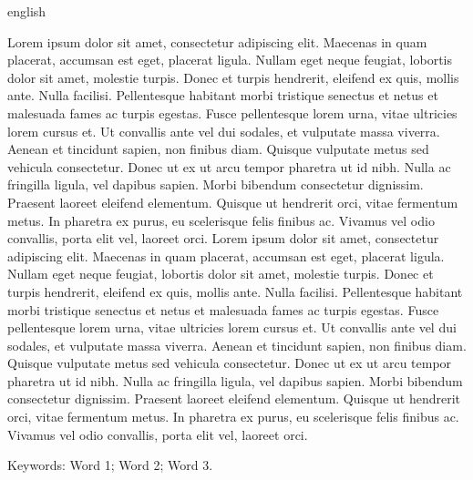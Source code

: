 \begin{resumo}[Abstract]
  \begin{otherlanguage*}{english}

    Lorem ipsum dolor sit amet, consectetur adipiscing elit. Maecenas in quam placerat, accumsan est eget, placerat ligula. Nullam eget neque feugiat, lobortis dolor sit amet, molestie turpis. Donec et turpis hendrerit, eleifend ex quis, mollis ante. Nulla facilisi. Pellentesque habitant morbi tristique senectus et netus et malesuada fames ac turpis egestas. Fusce pellentesque lorem urna, vitae ultricies lorem cursus et. Ut convallis ante vel dui sodales, et vulputate massa viverra. Aenean et tincidunt sapien, non finibus diam. Quisque vulputate metus sed vehicula consectetur. Donec ut ex ut arcu tempor pharetra ut id nibh. Nulla ac fringilla ligula, vel dapibus sapien. Morbi bibendum consectetur dignissim. Praesent laoreet eleifend elementum. Quisque ut hendrerit orci, vitae fermentum metus. In pharetra ex purus, eu scelerisque felis finibus ac. Vivamus vel odio convallis, porta elit vel, laoreet orci. Lorem ipsum dolor sit amet, consectetur adipiscing elit. Maecenas in quam placerat, accumsan est eget, placerat ligula. Nullam eget neque feugiat, lobortis dolor sit amet, molestie turpis. Donec et turpis hendrerit, eleifend ex quis, mollis ante. Nulla facilisi. Pellentesque habitant morbi tristique senectus et netus et malesuada fames ac turpis egestas. Fusce pellentesque lorem urna, vitae ultricies lorem cursus et. Ut convallis ante vel dui sodales, et vulputate massa viverra. Aenean et tincidunt sapien, non finibus diam. Quisque vulputate metus sed vehicula consectetur. Donec ut ex ut arcu tempor pharetra ut id nibh. Nulla ac fringilla ligula, vel dapibus sapien. Morbi bibendum consectetur dignissim. Praesent laoreet eleifend elementum. Quisque ut hendrerit orci, vitae fermentum metus. In pharetra ex purus, eu scelerisque felis finibus ac. Vivamus vel odio convallis, porta elit vel, laoreet orci.
    
    \vspace{\baselineskip}

    Keywords: Word 1; Word 2; Word 3.
  \end{otherlanguage*}
\end{resumo}